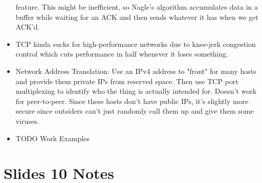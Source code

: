 \documentclass{scrartcl}
\begin{document}
\begin{itemize}
feature. This might be inefficient, so Nagle's algorithm accumulates data
in a buffer while waiting for an ACK and then sends whatever it has when
we get ACK'd.
\item TCP kinda sucks for high-performance networks due to knee-jerk
congestion control which cuts performance in half whenever it loses
something.
\item Network Address Translation: Use an IPv4 address to "front" for
many hosts and provide them private IPs from reserved space.
Then use TCP port multiplexing to identify who the thing is actually
intended for. Doesn't work for peer-to-peer. Since these hosts don't
have public IPs, it's slightly more secure since outsiders can't just
randomly call them up and give them some viruses.
\item TODO Work Examples
\end{itemize}
\section*{Slides 10 Notes}
\end{document}

